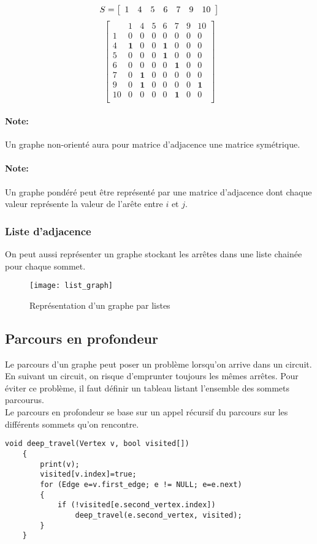 \documentclass[11pt]{extarticle}
\begin{document}
\[
S = 
\left[
\begin{array}{ccccccc}
1 & 4 & 5 & 6 & 7 & 9 & 10 
\end{array}\\
\right]
\]
\[
\left[
\begin{array}{c|ccccccc}
 & 1 & 4 & 5 & 6 & 7 & 9 & 10 \\
 \hline
 1 & 0 & 0 & 0 & 0 & 0 & 0 & 0 \\
 4 & \textbf{1} & 0 & 0 & \textbf{1} & 0 & 0 & 0 \\
 5 & 0 & 0 & 0 & \textbf{1} & 0 & 0 & 0 \\
 6 & 0 & 0 & 0 & 0 & \textbf{1} & 0 & 0 \\
 7 & 0 & \textbf{1} & 0 & 0 & 0 & 0 & 0 \\
 9 & 0 & \textbf{1} & 0 & 0 & 0 & 0 & \textbf{1} \\
 10 & 0 & 0 & 0 & 0 & \textbf{1} & 0 & 0 \\
\end{array}
\right]
\]
\paragraph{\textbf{Note:}} Un graphe non-orienté aura pour matrice d'adjacence une matrice symétrique.
\paragraph{\textbf{Note:}} Un graphe pondéré peut être représenté par une matrice d'adjacence dont chaque valeur représente la valeur de l'arête entre $i$ et $j$.
\subsubsection{Liste d'adjacence}
On peut aussi représenter un graphe stockant les arrêtes dans une liste chainée pour chaque sommet.
\begin{figure}[h]
\begin{center}
\texttt{[image: list\_graph]}
\caption{Représentation d'un graphe par listes}
\end{center}
\end{figure}
\newpage
\subsection{Parcours en profondeur}
Le parcours d'un graphe peut poser un problème lorsqu'on arrive dans un circuit. En suivant un circuit, on risque d'emprunter toujours les mêmes arrêtes. Pour éviter ce problème, il faut définir un tableau listant l'ensemble des sommets parcourus. \\
Le parcours en profondeur se base sur un appel récursif du parcours sur les différents sommets qu'on rencontre.
\begin{center}
\begin{lstlisting}[style=customc, escapechar=@]
	void deep_travel(Vertex v, bool visited[])
	{
		print(v);
		visited[v.index]=true; 
		for (Edge e=v.first_edge; e != NULL; e=e.next)
		{
			if (!visited[e.second_vertex.index])
				deep_travel(e.second_vertex, visited);
		}
	}
\end{lstlisting}
\end{center}
\end{document}
